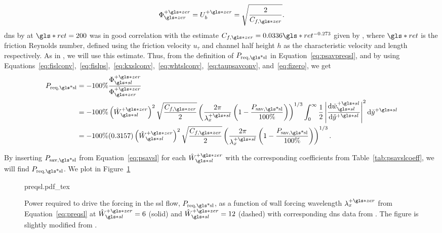 \begin{equation}
	\Phi\pz\zz=U_b\pz=\sqrt{\frac{2}{C_{f,\gls*{zer}}}} \label{eq:fizero}
.\end{equation}
\gls*{dns} by \textcite{viotti2009} at $\gls*{ret}=200$ was in good correlation with the estimate $C_{f,\gls*{zer}}=0.0336 \gls*{ret}^{-0.273}$ given by \cite{pope2001}, where $\gls*{ret}$ is the friction Reynolds number, defined using the friction velocity $u_\tau$ and channel half height  $h$ as the characteristic velocity and length respectively. As in \cite{viotti2009,chernyshenko2013}, we will use this estimate.
Thus, from the definition of $P_\text{req,\gls*{sl}} $ in Equation~\eqref{eq:psavpreqsl}, and by using Equations~\eqref{eq:fislconv},~\eqref{eq:fislps},~\eqref{eq:kxslconv},~\eqref{eq:whtslconv},~\eqref{eq:taupsavconv}, and~\eqref{eq:fizero}, we get
\begin{align}
	P_\text{req,\gls*{sl}}&=-100\%\frac{\Phi \pz\ssl}{\Phi \pz\zz}\\
			      &=-100\%\left( \hat{W}\ssl\pz \right)^2 \sqrt{\frac{C_{f,\gls*{zer}}}{2}} \left( \frac{2\pi}{\lambda_x\ps}\left( 1-\frac{P_\text{sav,\gls*{sl}} }{100\%} \right)  \right) ^{1 /3}  \int_{0}^{\infty}\frac{1}{2} \left| \dv{\check{w}\ssl\ps}{\check{y}\ps}  \right| ^2 \dd{\check{y}\ps}\\
			      &=-100\%(0.3157)\left( \hat{W}\ssl\pz \right)^2 \sqrt{\frac{C_{f,\gls*{zer}}}{2}} \left( \frac{2\pi}{\lambda_x\ps}\left( 1-\frac{P_\text{sav,\gls*{sl}} }{100\%} \right)  \right) ^{1 /3}\label{eq:preqsl}
.\end{align}

By inserting $P_\text{sav,\gls*{sl}} $ from Equation~\eqref{eq:psavsl} for each $\hat{W}\ssl\pz$ with the corresponding coefficients from Table~\ref{tab:psavslcoeff}, we will find $P_\text{req,\gls*{sl}} $. We plot  in Figure~\ref{fig:preqsl}

\begin{figure}[htbp]
	\centering
	\def\svgwidth{0.7\textwidth}
	{preqsl.pdf_tex}
	\caption[$P_\text{req,\gls*{sl}} $ as a function of wall forcing wavelength $\lambda_x\pz$]{Power required to drive the forcing in the  \gls*{ssl} flow, $P_\text{req,\gls*{sl}} $, as a function of wall forcing wavelength $\lambda_x\pz$ from Equation~\eqref{eq:preqsl} at $\hat{W}\pz\ssl=6$ (solid) and $\hat{W}\pz\ssl=12$ (dashed) with corresponding \gls*{dns} data from \textcite{viotti2009}. The figure is slightly modified from \cite{chernyshenko2013}.} 
	\label{fig:preqsl}
\end{figure}


